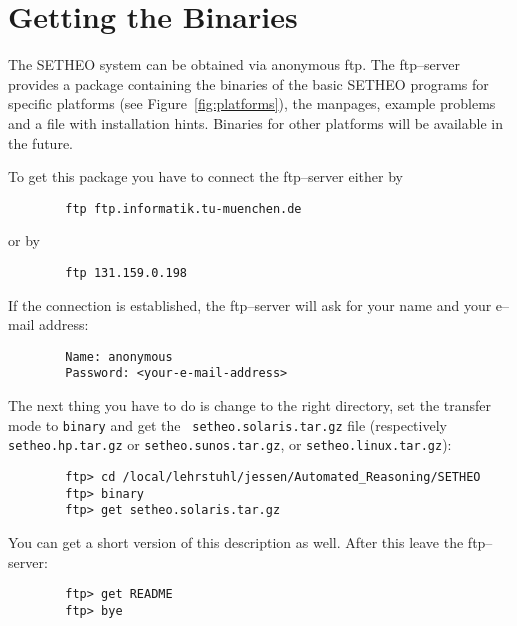 %
\section{Getting the Binaries}\label{sec:get-bin}

The SETHEO system can be obtained via anonymous ftp. The ftp--server
provides a package containing the binaries of the basic SETHEO
programs for specific platforms (see Figure~\ref{fig:platforms}), the
manpages, example problems and a file with installation
hints. Binaries for other platforms will be available in the future. 



To get this package you have to connect the ftp--server either by
\begin{verbatim}
        ftp ftp.informatik.tu-muenchen.de
\end{verbatim}
or by
\begin{verbatim} 
        ftp 131.159.0.198
\end{verbatim}
If the connection is established, the ftp--server will ask for your
name and your e--mail address:
\begin{verbatim}
        Name: anonymous
        Password: <your-e-mail-address>
\end{verbatim}
The next thing you have to do is change to the right directory, set
the transfer mode to {\tt binary} and get the {\tt
setheo.solaris.tar.gz} file (respectively {\tt setheo.hp.tar.gz} or
{\tt setheo.sunos.tar.gz}, or {\tt setheo.linux.tar.gz}): 
\begin{verbatim}
        ftp> cd /local/lehrstuhl/jessen/Automated_Reasoning/SETHEO
        ftp> binary
        ftp> get setheo.solaris.tar.gz
\end{verbatim}
You can get a short version of this description as well. After this
leave the ftp--server: 
\begin{verbatim}
        ftp> get README
        ftp> bye
\end{verbatim}



